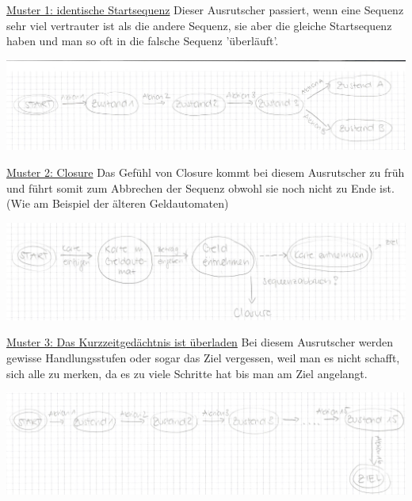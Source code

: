 \underline{Muster 1: identische Startsequenz}
\newline
Dieser Ausrutscher passiert, wenn eine Sequenz sehr 
viel vertrauter ist als die andere Sequenz, sie aber 
die gleiche Startsequenz haben und man so oft in die 
falsche Sequenz 'überläuft'.

\includegraphics[scale=.5]{images/Muster1.jpeg}

\underline{Muster 2: Closure}
\newline
Das Gefühl von Closure kommt bei diesem Ausrutscher zu 
früh und führt somit zum Abbrechen der Sequenz obwohl 
sie noch nicht zu Ende ist. (Wie am Beispiel der älteren 
Geldautomaten)

\includegraphics[scale=.5]{images/Muster2.jpeg}

\underline{Muster 3: Das Kurzzeitgedächtnis ist überladen}
\newline
Bei diesem Ausrutscher werden gewisse Handlungsstufen 
oder sogar das Ziel vergessen, weil man es nicht schafft, 
sich alle zu merken, da es zu viele Schritte hat bis man am 
Ziel angelangt.

\includegraphics[scale=.5]{images/Muster3.jpeg}
